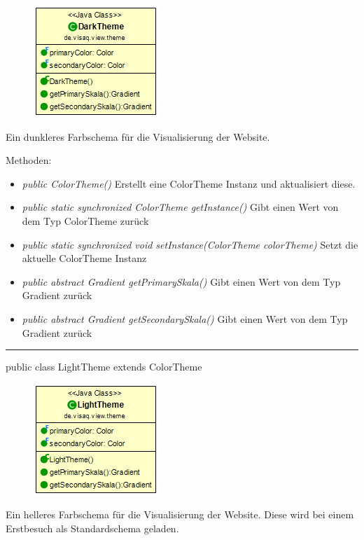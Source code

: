 \begin{minipage}{0.3\textwidth}
    \begin{figure}[H]
        \includegraphics[scale = 0.5]{media/frontend/view/de.view.elements.theme/DarkTheme_Class.png}
    \end{figure}
    \end{minipage} \hfill
    \begin{minipage}{0.6\textwidth}
       Ein dunkleres Farbschema für die Visualisierung der Website.
    \end{minipage}

Methoden:
\begin{itemize} 
    \item \emph{public ColorTheme()} Erstellt eine ColorTheme Instanz und aktualisiert diese.
    \item \emph{public static synchronized ColorTheme getInstance()} Gibt einen Wert von dem Typ ColorTheme zurück
    \item \emph{public static synchronized void setInstance(ColorTheme colorTheme)} Setzt die aktuelle ColorTheme Instanz    \item \emph{public abstract Gradient getPrimarySkala()} Gibt einen Wert von dem Typ Gradient zurück
    \item \emph{public abstract Gradient getSecondarySkala()}  Gibt einen Wert von dem Typ Gradient zurück
\end{itemize}

\rule{\textwidth}{0.4pt} 
public class LightTheme extends ColorTheme

\begin{minipage}{0.3\textwidth}
    \begin{figure}[H]
        \includegraphics[scale = 0.5]{media/frontend/view/de.view.elements.theme/LightTheme_Class.png}
    \end{figure}
    \end{minipage} \hfill
    \begin{minipage}{0.6\textwidth}
        Ein helleres Farbschema für die Visualisierung der Website. Diese wird bei einem Erstbesuch als Standardschema geladen.
    \end{minipage}

